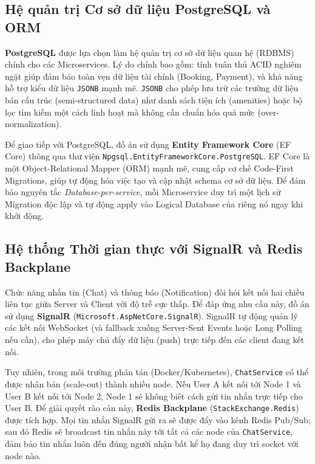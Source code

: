 \subsection{Hệ quản trị Cơ sở dữ liệu PostgreSQL và ORM}
\label{subsec:db_orm}

\textbf{PostgreSQL} được lựa chọn làm hệ quản trị cơ sở dữ liệu quan hệ (RDBMS) chính cho các Microservices.
Lý do chính bao gồm: tính tuân thủ ACID nghiêm ngặt giúp đảm bảo toàn vẹn dữ liệu tài chính (Booking, Payment),
và khả năng hỗ trợ kiểu dữ liệu \texttt{JSONB} mạnh mẽ. \texttt{JSONB} cho phép lưu trữ các trường dữ liệu bán cấu trúc
(semi-structured data) như danh sách tiện ích (amenities) hoặc bộ lọc tìm kiếm một cách linh hoạt mà không cần
chuẩn hóa quá mức (over-normalization).

Để giao tiếp với PostgreSQL, đồ án sử dụng \textbf{Entity Framework Core} (EF Core) thông qua thư viện \texttt{Npgsql.EntityFrameworkCore.PostgreSQL}.
EF Core là một Object-Relational Mapper (ORM) mạnh mẽ, cung cấp cơ chế Code-First Migrations, giúp
tự động hóa việc tạo và cập nhật schema cơ sở dữ liệu. Để đảm bảo nguyên tắc \textit{Database-per-service},
mỗi Microservice duy trì một lịch sử Migration độc lập và tự động apply vào Logical Database của riêng nó
ngay khi khởi động.

\subsection{Hệ thống Thời gian thực với SignalR và Redis Backplane}
\label{subsec:signalr_redis}

Chức năng nhắn tin (Chat) và thông báo (Notification) đòi hỏi kết nối hai chiều liên tục giữa Server và Client
với độ trễ cực thấp. Để đáp ứng nhu cầu này, đồ án sử dụng \textbf{SignalR} (\texttt{Microsoft.AspNetCore.SignalR}).
SignalR tự động quản lý các kết nối WebSocket (và fallback xuống Server-Sent Events hoặc Long Polling nếu cần),
cho phép máy chủ đẩy dữ liệu (push) trực tiếp đến các client đang kết nối.

Tuy nhiên, trong môi trường phân tán (Docker/Kubernetes), \texttt{ChatService} có thể được nhân bản (scale-out) thành nhiều node.
Nếu User A kết nối tới Node 1 và User B kết nối tới Node 2, Node 1 sẽ không biết cách gửi tin nhắn trực tiếp cho User B.
Để giải quyết rào cản này, \textbf{Redis Backplane} (\texttt{StackExchange.Redis}) được tích hợp.
Mọi tin nhắn SignalR gửi ra sẽ được đẩy vào kênh Redis Pub/Sub; sau đó Redis sẽ broadcast tin nhắn này tới tất cả
các node của \texttt{ChatService}, đảm bảo tin nhắn luôn đến đúng người nhận bất kể họ đang duy trì socket với node nào.

